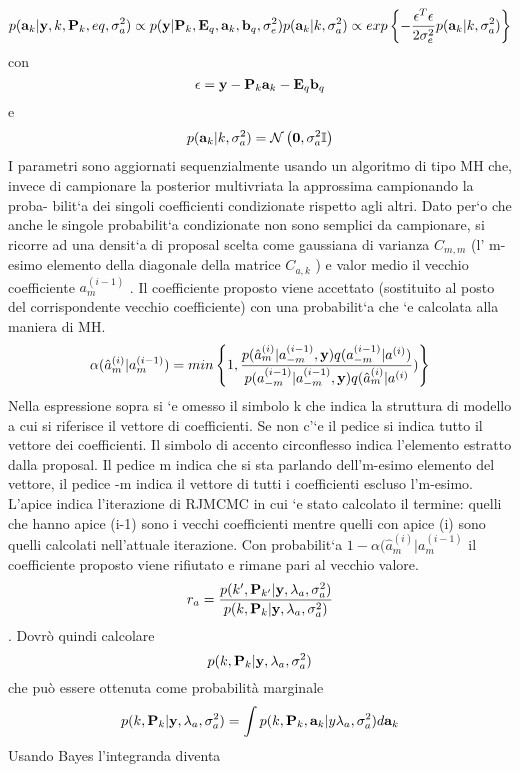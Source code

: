 \begin{equation}
p(\textbf{a}_k|\textbf{y},k,\textbf{P}_k,eq,\sigma_a^2)\propto p(\textbf{y}|\textbf{P}_k,\textbf{E}_q,\textbf{a}_k,\textbf{b}_q,\sigma_e^2)p(\textbf{a}_k|k,\sigma_a^2)\propto exp\left\lbrace- \frac{\epsilon^T\epsilon}{2\sigma_e^2}p(\textbf{a}_k|k,\sigma_a^2)\right\rbrace
\end{equation}
con
\begin{equation}
\epsilon=\textbf{y}-\textbf{P}_k\textbf{a}_k-\textbf{E}_q\textbf{b}_q
\end{equation}
e
\begin{equation}
p(\textbf{a}_k|k,\sigma_a^2)=\mathcal{N}\left(\textbf{0},\sigma_a^2 \mathbb{I}\right)
\end{equation}
I parametri sono aggiornati sequenzialmente usando un algoritmo di tipo MH che,
invece di campionare la posterior multivriata la approssima campionando la proba-
bilit`a dei singoli coefficienti condizionate rispetto agli altri. Dato per`o che anche le
singole probabilit`a condizionate non sono semplici da campionare, si ricorre ad una
densit`a di proposal scelta come gaussiana di varianza $C_{m,m}$ (l’ m-esimo elemento
della diagonale della matrice $C_{a,k}$ ) e valor medio il vecchio coefficiente $a_m^{(i-1)}$ . Il
coefficiente proposto viene accettato (sostituito al posto del corrispondente vecchio
coefficiente) con una probabilit`a che `e calcolata alla maniera di MH.
\begin{equation}
\alpha(\hat{a}_m^{(i)}|a_m^{(i-1)})=min\left\lbrace 1,\frac{p(\hat{a}_m^{(i)}|a_{-m}^{(i-1)},\textbf{y})q(a_{-m}^{(i-1)}|a^{(i)})}
{p(a_{-m}^{(i-1)}|a_{-m}^{(i-1)},\textbf{y})q(\hat{a}_m^{(i)}|a^{(i)}})\right\rbrace
\end{equation}
Nella espressione sopra si `e omesso il simbolo k che indica la struttura di modello a
cui si riferisce il vettore di coefficienti. Se non c’`e il pedice si indica tutto il vettore
dei coefficienti. Il simbolo di accento circonflesso indica l’elemento estratto dalla
proposal. Il pedice m indica che si sta parlando dell’m-esimo elemento del vettore,
il pedice -m indica il vettore di tutti i coefficienti escluso l’m-esimo. L’apice indica
l’iterazione di RJMCMC in cui `e stato calcolato il termine: quelli che hanno apice
(i-1) sono i vecchi coefficienti mentre quelli con apice (i) sono quelli calcolati
nell’attuale iterazione. Con probabilit`a $1-\alpha(\hat{a}_m^{(i)}|a_m^{(i-1)}$ il coefficiente proposto
viene rifiutato e rimane pari al vecchio valore.
\begin{equation}
r_a=\frac{p(k',\textbf{P}_{k'}|\textbf{y},\lambda_a,\sigma_a^2)}{p(k,\textbf{P}_k|\textbf{y},\lambda_a,\sigma_a^2)}
\end{equation}.
Dovrò quindi calcolare
\begin{equation}
p(k,\textbf{P}_k|\textbf{y},\lambda_a,\sigma_a^2)
\end{equation}
che può essere ottenuta come probabilità marginale
\begin{equation}
p(k,\textbf{P}_k|\textbf{y},\lambda_a,\sigma_a^2)=\int p(k,\textbf{P}_k,\textbf{a}_k|y\lambda_a,\sigma_a^2)d\textbf{a}_k
\end{equation}
Usando Bayes l'integranda diventa